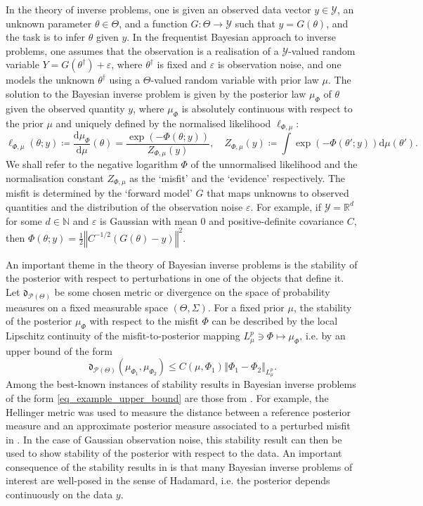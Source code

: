 \documentclass[a4paper]{scrartcl}
\theoremstyle{definition}
\numberwithin{equation}{section}
\newcommand{\R}{\mathbb{R}}
\newcommand{\N}{\mathbb{N}}
\newcommand{\rd}{\mathrm{d}}
\newcommand{\Norm}[1]{\left\Vert #1 \right\Vert}
\begin{document}
In the theory of inverse problems, one is given an observed data vector $y\in\mathcal{Y}$, an unknown parameter $\theta\in\Theta$, and a function $G:\Theta\to\mathcal{Y}$ such that $y=G(\theta)$, and the task is to infer $\theta$ given $y$. 
In the frequentist Bayesian approach to inverse problems, one assumes that the observation is a realisation of a $\mathcal{Y}$-valued random variable $Y=G(\theta^\dagger)+\varepsilon$, where $\theta^\dagger$ is fixed and $\varepsilon$ is observation noise, and one models the unknown $\theta^\dagger$ using a $\Theta$-valued random variable with prior law $\mu$. The solution to the Bayesian inverse problem is given by the posterior law $\mu_\Phi$ of $\theta$ given the observed quantity $y$, where $\mu_{\Phi}$ is absolutely continuous with respect to the prior $\mu$ and uniquely defined by the normalised likelihood $\ell_{\Phi,\mu}$:
\begin{equation}
\label{eq_generic_posterior}
 \ell_{\Phi,\mu}(\theta;y)\coloneqq \frac{\rd\mu_\Phi}{\rd\mu}(\theta)=\frac{\exp(-\Phi(\theta;y))}{Z_{\Phi,\mu}(y)} ,\quad Z_{\Phi,\mu}(y)\coloneqq \int \exp(-\Phi(\theta';y))\rd \mu(\theta').
\end{equation}
We shall refer to the negative logarithm $\Phi$ of the unnormalised likelihood and the normalisation constant $Z_{\Phi,\mu}$ as the `misfit' and the `evidence' respectively.
The misfit is determined by the `forward model' $G$ that maps unknowns to observed quantities and the distribution of the observation noise $\varepsilon$.
For example, if $\mathcal{Y}=\R^d$ for some $d\in\N$ and $\varepsilon$ is Gaussian with mean 0 and positive-definite covariance $C$, then $\Phi(\theta;y)=\tfrac{1}{2}\Norm{C^{-1/2}(G(\theta)-y)}^2$.

An important theme in the theory of Bayesian inverse problems is the stability of the posterior with respect to perturbations in one of the objects that define it.
Let $\mathfrak{d}_{\mathcal{P}(\Theta)}$ be some chosen metric or divergence on the space of probability measures on a fixed measurable space $(\Theta,\Sigma)$.
For a fixed prior $\mu$, the stability of the posterior $\mu_\Phi$ with respect to the misfit $\Phi$ can be described by the local Lipschitz continuity of the misfit-to-posterior mapping $L^p_\mu\ni \Phi\mapsto \mu_\Phi$, i.e. by an upper bound of the form
\begin{equation}
\label{eq_example_upper_bound}
 \mathfrak{d}_{\mathcal{P}(\Theta)}(\mu_{\Phi_1},\mu_{\Phi_2})\leq C(\mu,\Phi_1)\Norm{\Phi_1-\Phi_2}_{L^p_\mu}.
\end{equation}
Among the best-known instances of stability results in Bayesian inverse problems of the form \eqref{eq_example_upper_bound} are those from \cite{Stuart2010}.
For example, the Hellinger metric was used to measure the distance between a reference posterior measure and an approximate posterior measure associated to a perturbed misfit in \cite[Theorem 4.6]{Stuart2010}. 
In the case of Gaussian observation noise, this stability result can then be used to show stability of the posterior with respect to the data.
An important consequence of the stability results in \cite{Stuart2010} is that many Bayesian inverse problems of interest are well-posed in the sense of Hadamard, i.e. the posterior depends continuously on the data $y$.
\end{document}
